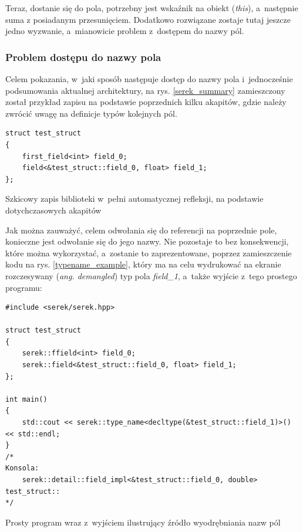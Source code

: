 \documentclass[12pt]{article}
\newcommand{\n}{\newline}
\newcommand{\nonpl}[1]{{\it #1}}
\newcommand{\code}[1]{{\it #1}}
\newcommand{\ang}[1]{\nonpl{ang. #1}}
\begin{document}
{{{				Teraz, dostanie się do pola, potrzebny jest wskaźnik na obiekt (\code{this}), a~następnie suma z posiadanym przesunięciem.
				Dodatkowo rozwiązane zostaje tutaj jeszcze jedno wyzwanie, a~mianowicie problem z~dostępem do nazwy pól.
			}

			{
				\subsubsection{Problem dostępu do nazwy pola}

				Celem pokazania, w~jaki sposób następuje dostęp do nazwy pola i~jednocześnie podsumowania aktualnej architektury, na rys. \ref{serek_summary} zamieszczony
				został przykład zapisu na podstawie poprzednich kilku akapitów, gdzie należy zwrócić uwagę na definicje typów kolejnych pól.\n

				\begin{captioned}[H]
					\begin{lstlisting}[frame=single]
struct test_struct
{
	first_field<int> field_0;
	field<&test_struct::field_0, float> field_1;
};
					\end{lstlisting}
					\caption{ Szkicowy zapis biblioteki w~pełni automatycznej refleksji, na podstawie dotychczasowych akapitów}
					\label{serek_summary}
				\end{captioned}


				Jak można zauważyć, celem odwołania się do referencji na poprzednie pole, konieczne jest odwołanie się do jego nazwy. Nie pozostaje to bez
				konsekwencji, które można wykorzystać, a~zostanie to zaprezentowane, poprzez zamieszczenie kodu na rys. \ref{typename_example}, który
				ma na celu wydrukować na ekranie rozczesywany (\ang{demangled}) typ pola \code{field\_1}, a~także wyjście z~tego prostego programu:\n

				\begin{captioned}[H]
				\begin{lstlisting}[frame=single]
#include <serek/serek.hpp>

struct test_struct
{
	serek::ffield<int> field_0;
	serek::field<&test_struct::field_0, float> field_1;
};

int main()
{
	std::cout << serek::type_name<decltype(&test_struct::field_1)>() << std::endl;
}
/*
Konsola:
	serek::detail::field_impl<&test_struct::field_0, double> test_struct::
*/
				\end{lstlisting}
				\caption{ Prosty program wraz z~wyjściem ilustrujący źródło wyodrębniania nazw pól}
				\label{typename_example}
			\end{captioned}

}}}
\end{document}

